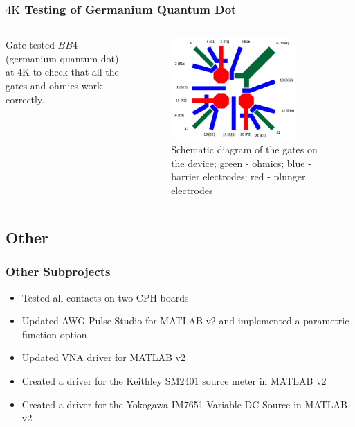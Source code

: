 \documentclass{beamer}
\begin{document}
\begin{frame}
    \frametitle{$4\si{\kelvin}$ Testing of Germanium Quantum Dot}

    \begin{columns}
        \begin{column}{0.3\textwidth}
            Gate tested $BB4$ (germanium quantum dot) at $4\si{\kelvin}$ to check that all the gates and ohmics work correctly.
        \end{column}
        \begin{column}{0.7\textwidth}
            \begin{figure}
                \centering
                \includegraphics[width=0.8\textwidth]{bb4.png}
                \caption{Schematic diagram of the gates on the device; green - ohmics; blue - barrier electrodes; red - plunger electrodes}
            \end{figure}
        \end{column}
    \end{columns}


\end{frame}

\subsection{Other}

\begin{frame}
    \frametitle{Other Subprojects}

    \begin{itemize}
        \item Tested all contacts on two CPH boards
        \item Updated AWG Pulse Studio for MATLAB v2 and implemented a parametric function option
        \item Updated VNA driver for MATLAB v2
        \item Created a driver for the Keithley SM2401 source meter in MATLAB v2
        \item Created a driver for the Yokogawa IM7651 Variable DC Source in MATLAB v2
    \end{itemize}

\end{frame}
\end{document}
